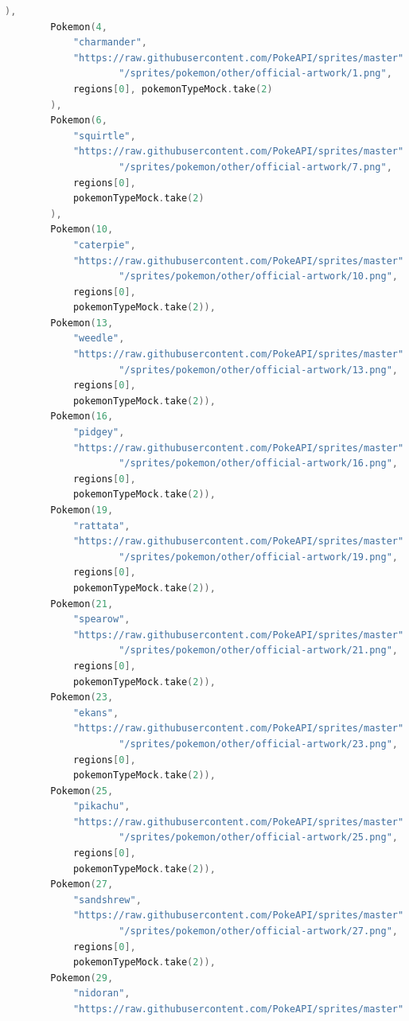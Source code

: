 \documentclass[a4paper, 12pt]{article}
\begin{document}
\begin{lstlisting}[caption={PokemonMockData Object.}, label={code:mockData}, language=Kotlin]
        ),
        Pokemon(4,
            "charmander",
            "https://raw.githubusercontent.com/PokeAPI/sprites/master" +
                    "/sprites/pokemon/other/official-artwork/1.png",
            regions[0], pokemonTypeMock.take(2)
        ),
        Pokemon(6,
            "squirtle",
            "https://raw.githubusercontent.com/PokeAPI/sprites/master" +
                    "/sprites/pokemon/other/official-artwork/7.png",
            regions[0],
            pokemonTypeMock.take(2)
        ),
        Pokemon(10,
            "caterpie",
            "https://raw.githubusercontent.com/PokeAPI/sprites/master" +
                    "/sprites/pokemon/other/official-artwork/10.png",
            regions[0],
            pokemonTypeMock.take(2)),
        Pokemon(13,
            "weedle",
            "https://raw.githubusercontent.com/PokeAPI/sprites/master" +
                    "/sprites/pokemon/other/official-artwork/13.png",
            regions[0],
            pokemonTypeMock.take(2)),
        Pokemon(16,
            "pidgey",
            "https://raw.githubusercontent.com/PokeAPI/sprites/master" +
                    "/sprites/pokemon/other/official-artwork/16.png",
            regions[0],
            pokemonTypeMock.take(2)),
        Pokemon(19,
            "rattata",
            "https://raw.githubusercontent.com/PokeAPI/sprites/master" +
                    "/sprites/pokemon/other/official-artwork/19.png",
            regions[0],
            pokemonTypeMock.take(2)),
        Pokemon(21,
            "spearow",
            "https://raw.githubusercontent.com/PokeAPI/sprites/master" +
                    "/sprites/pokemon/other/official-artwork/21.png",
            regions[0],
            pokemonTypeMock.take(2)),
        Pokemon(23,
            "ekans",
            "https://raw.githubusercontent.com/PokeAPI/sprites/master" +
                    "/sprites/pokemon/other/official-artwork/23.png",
            regions[0],
            pokemonTypeMock.take(2)),
        Pokemon(25,
            "pikachu",
            "https://raw.githubusercontent.com/PokeAPI/sprites/master" +
                    "/sprites/pokemon/other/official-artwork/25.png",
            regions[0],
            pokemonTypeMock.take(2)),
        Pokemon(27,
            "sandshrew",
            "https://raw.githubusercontent.com/PokeAPI/sprites/master" +
                    "/sprites/pokemon/other/official-artwork/27.png",
            regions[0],
            pokemonTypeMock.take(2)),
        Pokemon(29,
            "nidoran",
            "https://raw.githubusercontent.com/PokeAPI/sprites/master" +

\end{lstlisting}
\end{document}
